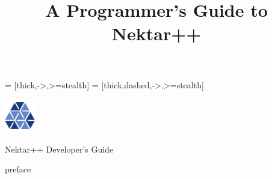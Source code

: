 

\DeclareOldFontCommand{\bf}{\normalfont\bfseries}{\mathbf}

\usepackage{makeidx}
\usepackage{multirow}
\usepackage{hyperref}
\hypersetup{
    colorlinks=true,
    linkcolor=blue,
    filecolor=magenta,      
    urlcolor=cyan,
}
 
 
 \makeindex

\newcommand\nek{\emph{Nektar++}}
\newcommand\shp{spectral/$hp$}
\newcommand\Shp{Spectral/$hp$}
\newcommand{\GIT}{\textit{git}}
\def\code#1{\texttt{#1}}
\newcommand\hlink{\hyperlink}
\newcommand\htarget{\hypertarget}%
\newcommand{\BM}[1]{\mbox{\boldmath $#1$}}
\newcommand{\BMB}[1]{\mbox{$\mathbb #1$}}

\usepackage{tikz}
\usetikzlibrary{positioning}
\usetikzlibrary{calc}
\usetikzlibrary{shapes.geometric,arrows,automata}
=
[thick,->,>=stealth]
=
[thick,dashed,->,>=stealth]

\usepackage{standalone}
\usepackage{rotating}

\title{A Programmer's Guide to Nektar++}




\ifdefined\HCode
\begin{center}
    \includegraphics[width=0.1\textwidth]{img/icon-blue.png}
\end{center}
\maketitle
\begin{center}
       \huge{Nektar++ Developer's Guide}
\end{center}
\else
\titlepage
\fi

\clearpage

\ifx\HCode\undefined
\tableofcontents*
\fi
%

{preface}


%

%

